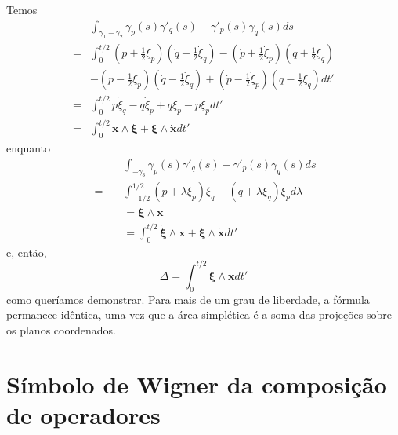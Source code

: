 \documentclass[
	12pt,
	oneside,			%
	a4paper,			%
	english,			%
	brazil				%
	]{abntex2}
\theoremstyle{definition}
\begin{document}
\begin{apendicesenv}
Temos
\begin{equation}
    \begin{aligned}
        &\int_{\gamma_1 - \gamma_2} \gamma_p(s) \gamma'_q(s) -  \gamma'_p(s) \gamma_q(s) ds \\
        = &\int_0^{t/2} \left( p + \frac{1}{2}\xi_p \right)\left( \dot{q} + \frac{1}{2}\dot{\xi}_q \right) - \left( \dot{p} + \frac{1}{2}\dot{\xi}_p \right)\left( q + \frac{1}{2}\xi_q \right) \\
        &- \left( p - \frac{1}{2}\xi_p \right)\left( \dot{q} - \frac{1}{2}\dot{\xi}_q \right) + \left( \dot{p} - \frac{1}{2}\dot{\xi}_p \right)\left( q - \frac{1}{2}\xi_q \right) dt' \\
        =&\int_0^{t/2} p \dot{\xi}_q - q \dot{\xi}_p + \dot{q} \xi_p - \dot{p} \xi_p dt' \\
        =&\int_0^{t/2} \mathbf{x}\wedge\dot{\boldsymbol{\xi}} + \boldsymbol{\xi} \wedge\dot{\mathbf{x}} dt'
    \end{aligned}
\end{equation}
enquanto 
\begin{equation}
    \begin{aligned}
        &\int_{- \gamma_3} \gamma_p(s) \gamma'_q(s) -  \gamma'_p(s) \gamma_q(s) ds \\
        = -&\int_{-1/2}^{1/2} \left( p + \lambda \xi_p \right) \xi_q - \left( q + \lambda \xi_q \right)\xi_p d\lambda \\
        &= \boldsymbol{\xi} \wedge \mathbf{x} \\
        &= \int_0^{t/2} \dot{\boldsymbol{\xi}} \wedge \mathbf{x} + \boldsymbol{\xi} \wedge \dot{\mathbf{x}} dt'
    \end{aligned}
\end{equation}
e, então,
\begin{equation}
    \Delta = \int_0^{t/2} \boldsymbol{\xi} \wedge \dot{\mathbf{x}} dt'
\end{equation}
como queríamos demonstrar. Para mais de um grau de liberdade, a fórmula permanece idêntica, uma vez que a área simplética é a soma das projeções sobre os planos coordenados.

\chapter{Símbolo de Wigner da composição de operadores}
\label{apendice_composição de operadores}


\end{apendicesenv}
\end{document}
